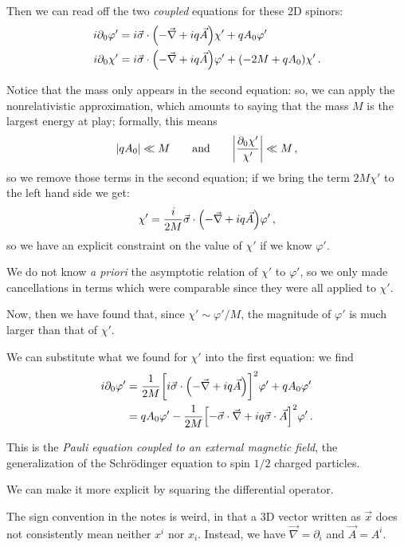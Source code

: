 \documentclass[main.tex]{subfiles}
\begin{document}
Then we can read off the two \emph{coupled} equations for these 2D spinors: 
%
\begin{align}
i \partial_0 \varphi ' &= i \vec{\sigma} \cdot \qty(- \vec{\nabla} + i q \vec{A}) \chi '
+ q A_0 \varphi '  \\
i \partial_0 \chi ' &= i \vec{\sigma} \cdot \qty(- \vec{\nabla} + i q \vec{A}) \varphi ' +
(- 2 M + q A_0 ) \chi '
\,.
\end{align}

Notice that the mass only appears in the second equation: so, we can apply the nonrelativistic approximation, which amounts to saying that the mass \(M\) is the largest energy at play; formally, this means 
%
\begin{align}
\abs{q A_0} \ll M 
\qquad \text{and} \qquad
\abs{\frac{\partial_0 \chi '}{\chi '}} \ll M
\,,
\end{align}
%
so we remove those terms in the second equation; if we bring the term \(2 M \chi '\) to the left hand side we get: 
%
\begin{align}
\chi ' =  \frac{i}{2M} \vec{\sigma} \cdot \qty(- \vec{\nabla} + i q \vec{A}) \varphi '
\,,
\end{align}
%
so we have an explicit constraint on the value of \(\chi '\) if we know \(\varphi '\).

We do not know \emph{a priori} the asymptotic relation of \(\chi '\) to \(\varphi '\), so we only made cancellations in terms which were comparable since they were all applied to \(\chi '\).

Now, then we have found that, since \(\chi ' \sim \varphi ' / M\), the magnitude of \(\varphi '\) is much larger than that of \(\chi '\). 

We can substitute what we found for \(\chi '\) into the first equation: we find 
%
\begin{align}
i \partial_0 \varphi ' &= \frac{1}{2M} \qty[i \vec{\sigma} \cdot \qty(- \vec{\nabla} + iq \vec{A})]^2 \varphi ' + q A_0 \varphi '  \\
&= q A_0 \varphi ' - \frac{1}{2M} \qty[- \vec{\sigma} \cdot \vec{\nabla} + iq \vec{\sigma} \cdot \vec{A}]^2 \varphi '
\,.
\end{align}

This is the \emph{Pauli equation coupled to an external magnetic field}, the generalization of the Schrödinger equation to spin \(1/2\) charged particles.

We can make it more explicit by squaring the differential operator.

The sign convention in the notes is weird, in that a 3D vector written as \(\vec{x}\) does not consistently mean neither \(x^{i}\) nor \(x_{i}\).
Instead, we have \(\vec{\nabla} = \partial_{i}  \) and \(\vec{A} = A^{i}\).
\end{document}
